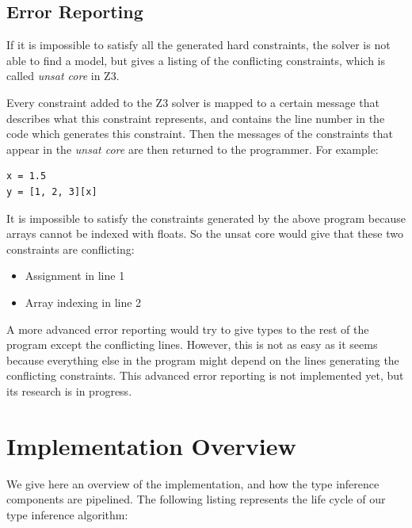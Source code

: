\subsection{Error Reporting}
If it is impossible to satisfy all the generated hard constraints, the solver is not able to find a model, but gives a listing of the conflicting constraints, which is called \textit{unsat core} in Z3.

Every constraint added to the Z3 solver is mapped to a certain message that describes what this constraint represents, and contains the line number in the code which generates this constraint. Then the messages of the constraints that appear in the \textit{unsat core} are then returned to the programmer. For example:
\begin{lstlisting}
x = 1.5
y = [1, 2, 3][x]
\end{lstlisting}

It is impossible to satisfy the constraints generated by the above program because arrays cannot be indexed with floats. So the unsat core would give that these two constraints are conflicting:
\begin{itemize}
	\item Assignment in line 1
	\item Array indexing in line 2
\end{itemize}

A more advanced error reporting would try to give types to the rest of the program except the conflicting lines. However, this is not as easy as it seems because everything else in the program might depend on the lines generating the conflicting constraints. This advanced error reporting is not implemented yet, but its research is in progress.

\section{Implementation Overview}
We give here an overview of the implementation, and how the type inference components are pipelined. The following listing represents the life cycle of our type inference algorithm:

